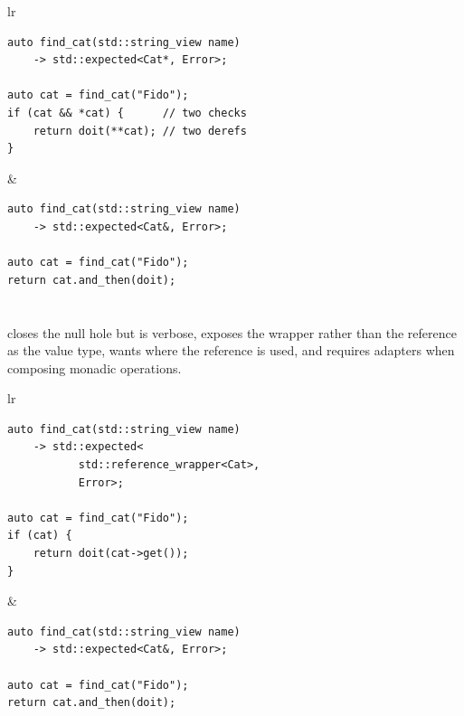 \documentclass[a4paper,10pt,oneside,openany,final,article]{memoir}
\begin{document}
\begin{tabular}{ lr }
  \begin{minipage}[t]{0.45\columnwidth}
    \begin{verbatim}
auto find_cat(std::string_view name)
    -> std::expected<Cat*, Error>;

auto cat = find_cat("Fido");
if (cat && *cat) {      // two checks
    return doit(**cat); // two derefs
}
    \end{verbatim}
  \end{minipage}
  &
    \begin{minipage}[t]{0.45\columnwidth}
      \begin{verbatim}
auto find_cat(std::string_view name)
    -> std::expected<Cat&, Error>;

auto cat = find_cat("Fido");
return cat.and_then(doit);
      \end{verbatim}
    \end{minipage}
\end{tabular}

\section{}

 closes the null hole but is verbose, exposes the
wrapper rather than the reference as the value type, wants  where
the reference is used, and requires adapters when composing monadic operations.

\begin{tabular}{ lr }
  \begin{minipage}[t]{0.45\columnwidth}
    \begin{verbatim}
auto find_cat(std::string_view name)
    -> std::expected<
           std::reference_wrapper<Cat>,
           Error>;

auto cat = find_cat("Fido");
if (cat) {
    return doit(cat->get());
}
    \end{verbatim}
  \end{minipage}
  &
    \begin{minipage}[t]{0.45\columnwidth}
      \begin{verbatim}
auto find_cat(std::string_view name)
    -> std::expected<Cat&, Error>;

auto cat = find_cat("Fido");
return cat.and_then(doit);
      \end{verbatim}
    \end{minipage}
\end{tabular}
\end{document}
